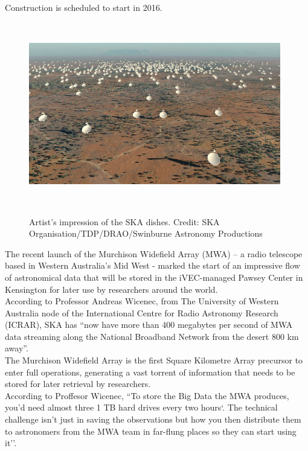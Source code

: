 Construction is scheduled to start in 2016.\\

\begin{figure}
\centering
\includegraphics[width=11cm,height=8cm]{images/ska.jpg}\\
\caption{Artist's impression of the SKA dishes. Credit: SKA Organisation/TDP/DRAO/Swinburne Astronomy Productions}
\end{figure}


The recent launch of the Murchison Widefield Array (MWA) – a radio telescope based in Western Australia's Mid West - marked the start of an impressive flow of astronomical data that will be stored in the iVEC-managed Pawsey Center in Kensington for later use by researchers around the world.\\

According to Professor Andreas Wicenec, from The University of Western Australia node of the International Centre for Radio Astronomy Research (ICRAR), SKA has ``now have more than 400 megabytes per second of MWA data streaming along the National Broadband Network from the desert 800 km away''.\\

The Murchison Widefield Array is the first Square Kilometre Array precursor to enter full operations, generating a vast torrent of information that needs to be stored for later retrieval by researchers.\\

According to Proffesor Wicenec, ``To store the Big Data the MWA produces, you’d need almost three 1 TB hard drives every two hours`. The technical challenge isn’t just in saving the observations but how you then distribute them to astronomers from the MWA team in far-flung places so they can start using it''.\\

